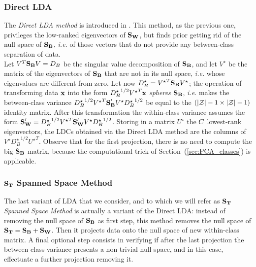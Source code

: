\subsubsection{Direct LDA}
The {\em Direct LDA method} is introduced in \cite{Yu01adirect}. This method, as the previous one, privileges the low-ranked eigenvectors of $\textbf{S}_{\textbf{W}}$, but finds prior getting rid of the null space of $\textbf{S}_{\textbf{B}}$, \textit{i.e.} of those vectors that do not provide any between-class separation of data. \\
Let $V^T\textbf{S}_{\textbf{B}} V = D_B$ be the singular value decomposition of $\textbf{S}_{\textbf{B}}$, and let $V^\star$ be the matrix of the eigenvectors of $\textbf{S}_{\textbf{B}}$ that are not in its null space, \textit{i.e.} whose eigenvalues are different from zero. Let now $D_B^\star ={V^\star}^T\textbf{S}_{\textbf{B}} V^\star$; the operation of transforming data $\textbf{x}$ into the form ${D_B^\star}^{1/2}{V^\star}^T\textbf{x}$ {\em spheres} $\textbf{S}_{\textbf{B}}$, \textit{i.e.} makes the between-class variance ${D_B^\star}^{1/2}{V^\star}^T\textbf{S}_{\textbf{B}} ' V^\star {D_B^\star}^{1/2} $ be equal to the $(\lvert \mathcal{Z} \rvert - 1 \times \lvert \mathcal{Z} \rvert - 1)$ identity matrix. After this transformation the within-class variance assumes the form $\textbf{S}_{\textbf{W}}' = {D_B^\star}^{1/2}{V^\star}^T\textbf{S}_{\textbf{W}} ' V^\star {D_B^\star}^{1/2}$. Storing in a matrix $U^\star$ the $C$ lowest-rank eigenvectors, the LDCs obtained via the Direct LDA method are the columns of $V^\star{D_B^\star}^{1/2}{U^\star}^T$. Observe that for the first projection, there is no need to compute the big $\textbf{S}_{\textbf{B}}$ matrix, because the computational trick of Section~(\ref{sec:PCA_classes}) is applicable.


\subsubsection{$\textbf{S}_{\textbf{T}}$ Spanned Space Method}
The last variant of LDA that we consider, and to which we will refer as {\em $\textbf{S}_{\textbf{T}}$ Spanned Space Method} \cite{huang} is actually a variant of the Direct LDA: instead of removing the null space of $\textbf{S}_{\textbf{B}}$ as first step, this method removes the null space of $\textbf{S}_{\textbf{T}} = \textbf{S}_{\textbf{B}} + \textbf{S}_{\textbf{W}}$. Then it projects data onto the null space of new within-class matrix. A final optional step consists in verifying if after the last projection the between-class variance presents a non-trivial null-space, and in this case, effectuate a further projection removing it.




